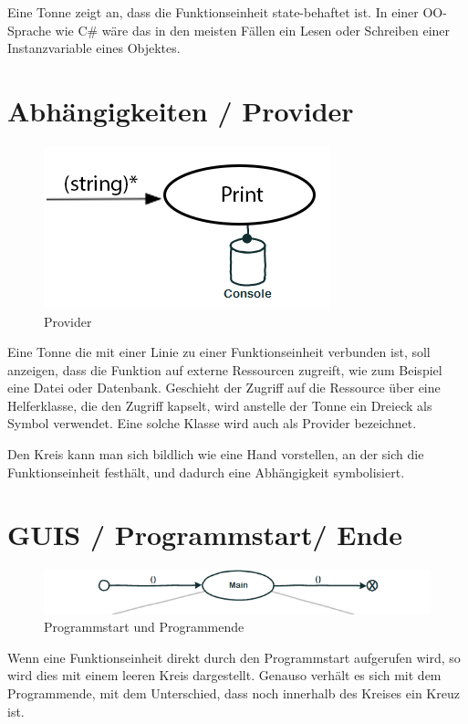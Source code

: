Eine Tonne zeigt an, dass die Funktionseinheit state-behaftet ist.
In einer OO-Sprache wie C\# wäre das in den meisten Fällen ein Lesen oder
Schreiben einer Instanzvariable eines Objektes.

\section{Abhängigkeiten / Provider}

\begin{figure}[H]
	\centering
		\includegraphics[width=.5\linewidth]{./img/diagramProvider.png}
	\caption{Provider}
\end{figure}



Eine Tonne die mit einer Linie zu einer Funktionseinheit verbunden ist, soll
anzeigen, dass die Funktion auf externe Ressourcen zugreift, wie zum
Beispiel eine Datei oder Datenbank. 
Geschieht der Zugriff auf die Ressource über eine Helferklasse, die den Zugriff
kapselt, wird anstelle der Tonne ein Dreieck als Symbol verwendet. Eine solche
Klasse wird auch als Provider bezeichnet. 

Den Kreis kann man sich bildlich wie eine Hand vorstellen, an der sich die
Funktionseinheit festhält, und dadurch eine Abhängigkeit symbolisiert.

\pagebreak

\section{GUIS / Programmstart/ Ende}

\begin{figure}[H]
	\centering
		\includegraphics[width=.9\linewidth]{./img/diagramStartEnd.png}
	\caption{Programmstart und Programmende}
\end{figure}




Wenn eine Funktionseinheit direkt durch den Programmstart aufgerufen wird, so
wird dies mit einem leeren Kreis dargestellt. Genauso verhält es sich mit dem
Programmende, mit dem Unterschied, dass noch innerhalb des Kreises ein Kreuz ist.

